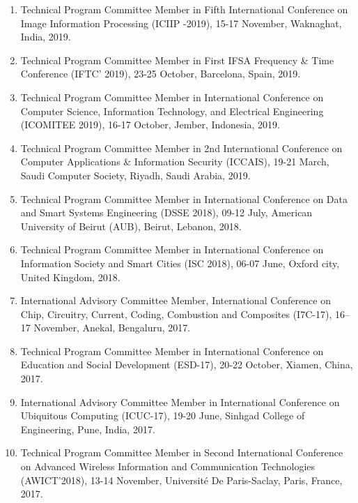 \documentclass[11pt,a4paper]{moderncv}
\begin{document}
\begin{adjustwidth}{6em}{0pt}
\begin{enumerate}
		\item Technical Program Committee Member in Fifth International Conference on Image Information Processing (ICIIP -2019), 15-17 November, Waknaghat, India, 2019.
		
		\item Technical Program Committee Member in First IFSA Frequency \& Time Conference (IFTC' 2019), 23-25 October, Barcelona, Spain, 2019.
		
		\item Technical Program Committee Member in International Conference on Computer Science, Information Technology, and Electrical Engineering (ICOMITEE 2019), 16-17 October, Jember, Indonesia, 2019.
		
		\item Technical Program Committee Member in 2nd International Conference on Computer Applications \& Information Security (ICCAIS), 19-21 March, Saudi Computer Society, Riyadh, Saudi Arabia, 2019.
		
		\item Technical Program Committee Member in International Conference on Data and Smart Systems Engineering (DSSE 2018), 09-12 July, American University of Beirut (AUB), Beirut, Lebanon, 2018.
		
		\item Technical Program Committee Member in International Conference on Information Society and Smart Cities (ISC 2018), 06-07 June, Oxford city, United Kingdom, 2018.
		
		\item International Advisory Committee Member, International Conference on Chip, Circuitry, Current, Coding, Combustion and Composites (I7C-17), 16–17 November, Anekal, Bengaluru, 2017.
		
		\item Technical Program Committee Member in International Conference on Education and Social Development (ESD-17), 20-22 October, Xiamen, China, 2017.
		
		\item International Advisory Committee Member in International Conference on Ubiquitous Computing (ICUC-17), 19-20 June, Sinhgad College of Engineering, Pune, India, 2017.
		
		\item Technical Program Committee Member in Second International Conference on Advanced Wireless Information and Communication Technologies (AWICT’2018), 13-14 November, Université De Paris-Saclay, Paris, France, 2017.
		

\end{enumerate}
\end{adjustwidth}
\end{document}
